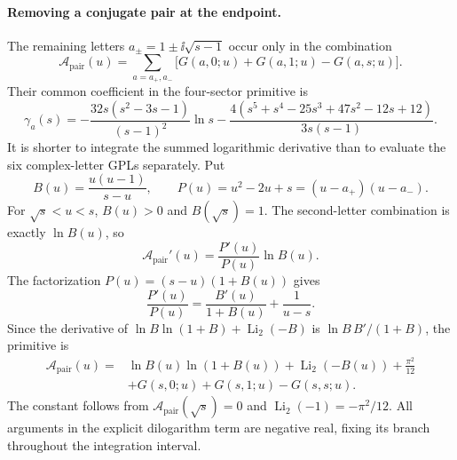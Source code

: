 \paragraph{Removing a conjugate pair at the endpoint.}
The remaining letters $a_\pm=1\pm\ii\sqrt{s-1}$ occur only in the
combination
\begin{equation}
 \mathcal A_{\mathrm{pair}}(u)=\sum_{a=a_+,a_-}
       \bigl[G(a,0;u)+G(a,1;u)-G(a,s;u)\bigr].
\end{equation}
Their common coefficient in the four-sector primitive is
\begin{equation}
 \gamma_a(s)=-\frac{32s(s^2-3s-1)}{(s-1)^2}\ln s
 -\frac{4(s^5+s^4-25s^3+47s^2-12s+12)}{3s(s-1)}.
\end{equation}
It is shorter to integrate the summed logarithmic derivative than to
evaluate the six complex-letter GPLs separately. Put
\begin{equation}
 B(u)=\frac{u(u-1)}{s-u},\qquad
 P(u)=u^2-2u+s=(u-a_+)(u-a_-).
\end{equation}
For $\sqrt{s}<u<s$, $B(u)>0$ and $B(\sqrt{s})=1$.
The second-letter combination is exactly $\ln B(u)$, so
\begin{equation}
 \mathcal A_{\mathrm{pair}}'(u)=\frac{P'(u)}{P(u)}\ln B(u).
\end{equation}
The factorization $P(u)=(s-u)(1+B(u))$ gives
\begin{equation}
 \frac{P'(u)}{P(u)}=\frac{B'(u)}{1+B(u)}+\frac1{u-s}.
\end{equation}
Since the derivative of
$\ln B\ln(1+B)+\operatorname{Li}_2(-B)$ is
$\ln B\,B'/(1+B)$, the primitive is
\begin{equation}
 \begin{aligned}
 \mathcal A_{\mathrm{pair}}(u)={}&\ln B(u)\ln(1+B(u))+\operatorname{Li}_2(-B(u))
                      +\frac{\pi^2}{12}\\
 &+G(s,0;u)+G(s,1;u)-G(s,s;u).
 \end{aligned}
\end{equation}
The constant follows from $\mathcal A_{\mathrm{pair}}(\sqrt{s})=0$ and
$\operatorname{Li}_2(-1)=-\pi^2/12$. All arguments in the explicit
dilogarithm term are negative real, fixing its branch throughout the
integration interval.


